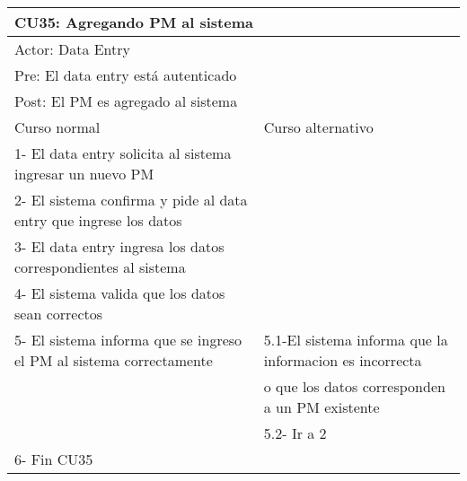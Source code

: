 \begin{table}[H]
  \begin{adjustbox}{max width = \textwidth}
  \begin{tabular}{|l|l|}
    \hline
    \multicolumn{2}{|l|}{CU35: Agregando PM al sistema} \\\hline
    \multicolumn{2}{|l|}{Actor: Data Entry} \\\hline
    \multicolumn{2}{|l|}{Pre: El data entry está autenticado} \\\hline
    \multicolumn{2}{|l|}{Post: El PM es agregado al sistema} \\\hline
     Curso normal & Curso alternativo\\ \hline
	 1- El data entry solicita al sistema ingresar un nuevo PM & \\ \hline
     2- El sistema confirma y pide al data entry que ingrese los datos & \\ \hline
     3- El data entry ingresa los datos correspondientes al sistema & \\ \hline
     4- El sistema valida que los datos sean correctos & \\ \hline
     5- El sistema informa que se ingreso el PM al sistema correctamente & 5.1-El sistema informa que la informacion es incorrecta \\ & o que los datos corresponden a un PM existente  \\ & 5.2- Ir a 2 \\ \hline
     6- Fin CU35 & \\ \hline
  \end{tabular}
  \end{adjustbox}
\end{table}


